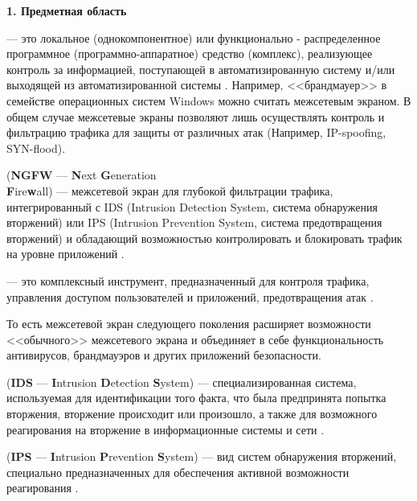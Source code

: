 \newpage

\begin{center}
	\textbf{\Large 1. Предметная область}
\end{center}

 --- это локальное (однокомпонентное) или функционально - распределенное программное (программно-аппаратное) средство (комплекс), реализующее контроль за информацией, поступающей в автоматизированную систему и/или выходящей из автоматизированной системы \cite{fw}. Например, <<брандмауер>> в семействе операционных систем Windows можно считать межсетевым экраном. В общем случае межсетевые экраны позволяют лишь осуществлять контроль и фильтрацию трафика для защиты от различных атак (Например, IP-spoofing, SYN-flood).
		
 (\textbf{NGFW} --- \textbf{N}ext \textbf{G}eneration \\\textbf{F}ire\textbf{w}all) --- межсетевой экран для глубокой фильтрации трафика, интегрированный с IDS (Intrusion Detection System, система обнаружения вторжений) или IPS (Intrusion Prevention System, система предотвращения вторжений) и обладающий возможностью контролировать и блокировать трафик на уровне приложений \cite{ngfw1}.

 --- это комплексный инструмент, предназначенный для контроля трафика, управления доступом пользователей и приложений, предотвращения атак \cite{ngfw2}.

То есть межсетевой экран следующего поколения расширяет возможности <<обычного>> межсетевого экрана и объединяет в себе функциональность антивирусов, брандмауэров и других приложений безопасности.

 (\textbf{IDS} --- \textbf{I}ntrusion \textbf{D}etection \textbf{S}ystem) --- специализированная система, используемая для идентификации того факта, что была предпринята попытка вторжения, вторжение происходит или произошло, а также для возможного реагирования на вторжение в информационные системы и сети \cite{ids}.

 (\textbf{IPS} --- \textbf{I}ntrusion \textbf{P}revention \textbf{S}ystem) --- вид систем обнаружения вторжений, специально предназначенных для обеспечения активной возможности реагирования \cite{ips}.

\newpage

